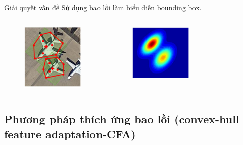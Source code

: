 \documentclass[11pt]{beamer}
\theoremstyle{definition}
\theoremstyle{plain}
\theoremstyle{plain}
\theoremstyle{remark}
\begin{document}
	
	\begin{frame} {Giải quyết vấn đề}
		Sử dụng bao lồi làm biểu diễn bounding box.
		\begin{columns}[c] %
			\begin{figure}
				\centering
				\includegraphics[width=3cm]{ConvexHull_Bouding_Box.jpg}
			
			\end{figure}
			
			\begin{figure}
				\centering
				\includegraphics[width=3cm]{reception_field_wo_aliasing.jpg}
			
			\end{figure}
		\end{columns}
	\end{frame}
	\subsection{Phương pháp thích ứng bao lồi (convex-hull feature adaptation-CFA)}
	
\end{document}
